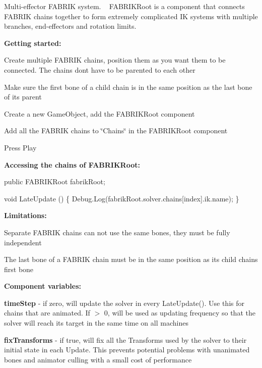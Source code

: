 Multi-\/effector F\+A\+B\+R\+IK system. ~\newline
F\+A\+B\+R\+I\+K\+Root is a component that connects F\+A\+B\+R\+IK chains together to form extremely complicated IK systems with multiple branches, end-\/effectors and rotation limits.

{\bfseries Getting started\+:}
\begin{DoxyItemize}
\item Create multiple F\+A\+B\+R\+IK chains, position them as you want them to be connected. The chains don\textquotesingle{}t have to be parented to each other
\item Make sure the first bone of a child chain is in the same position as the last bone of it\textquotesingle{}s parent
\item Create a new Game\+Object, add the F\+A\+B\+R\+I\+K\+Root component
\item Add all the F\+A\+B\+R\+IK chains to \char`\"{}\+Chains\char`\"{} in the F\+A\+B\+R\+I\+K\+Root component
\item Press Play
\end{DoxyItemize}

{\bfseries Accessing the chains of F\+A\+B\+R\+I\+K\+Root\+:}


\begin{DoxyCode}
\textcolor{keyword}{public} FABRIKRoot fabrikRoot;

\textcolor{keywordtype}{void} LateUpdate () \{
    Debug.Log(fabrikRoot.solver.chains[index].ik.name);
\}
\end{DoxyCode}


{\bfseries Limitations\+:}
\begin{DoxyItemize}
\item Separate F\+A\+B\+R\+IK chains can not use the same bones, they must be fully independent
\item The last bone of a F\+A\+B\+R\+IK chain must be in the same position as it\textquotesingle{}s child chain\textquotesingle{}s first bone
\end{DoxyItemize}

 {\bfseries Component variables\+:}
\begin{DoxyItemize}
\item {\bfseries time\+Step} -\/ if zero, will update the solver in every Late\+Update(). Use this for chains that are animated. If $>$ 0, will be used as updating frequency so that the solver will reach its target in the same time on all machines
\item {\bfseries fix\+Transforms} -\/ if true, will fix all the Transforms used by the solver to their initial state in each Update. This prevents potential problems with unanimated bones and animator culling with a small cost of performance
\end{DoxyItemize}

